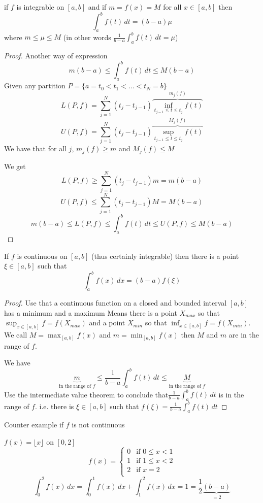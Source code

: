 \begin{theorem*}
  if $f$ is integrable on $[a, b]$ and if $m = f(x) = M$ for all $x \in [a, b]$ then
  \[\int_a^b f(t)\, dt = (b-a)\mu \]
  where $m \le \mu \le M$
  (in other words $\displaystyle \frac{1}{b-a}\int_a^b f(t) \,dt = \mu$)
\end{theorem*}

\begin{proof}
  Another way of expression 
  \[ m(b-a) \le \int_a^b f(t)\, dt \le M(b-a)\]
  Given any partition $P = \{a = t_0 < t_1 < \dotsc < t_N = b\}$
  \[ L(P, f) = \sum_{j=1}^N (t_j - t_{j-1}) \overbrace{\inf_{t_{j-1} \le t \le t_j} f(t)}^{m_j(f)}\]
  \[ U(P, f) = \sum_{j=1}^N (t_j - t_{j-1}) \overbrace{\sup_{t_{j-1} \le t \le t_j} f(t)}^{M_j(f)}\]
  We have that for all $j$, $m_j(f) \ge m$ and $M_j(f) \le M$

  We get 
  \[L(P, f) \ge \sum_{j=1}^N (t_j - t_{j-1})m = m(b-a)\]
  \[U(P, f) \le \sum_{j=1}^N (t_j - t_{j-1})M = M(b-a)\]
  \[m(b-a) \le L(P, f) \le \int_a^b f(t)\, dt \le U(P, f) \le M(b-a)\]
\end{proof}

\begin{theorem*}
  If $f$ is continuous on $[a, b]$ (thus certainly integrable) then there is a point $\xi \in [a, b]$
  such that 
  \[\int_a^b f(x)\,dx = (b-a)f(\xi)\]
\end{theorem*}

\begin{proof}
  Use that a continuous function on a closed and bounded interval $[a, b]$ has a minimum and a maximum
  Means there is a point $X_{max}$ so that $\sup_{x \in [a, b]} f = f(X_{max})$ and a point $X_{min}$ so that $\inf_{x \in [a, b]} f = f(X_{min})$.
  We call $M = \max_{[a, b]} f(x)$ and $m = \min_{[a, b]} f(x)$ then $M$ and $m$ are in the range of $f$.

  We have 
  \[\underbrace{m}_{\text{in the range of }f} \le \frac{1}{b-a}\int_a^b f(t)\,dt \le \underbrace{M}_{\text{in the range of }f}\]
  Use the intermediate value theorem to conclude that$\displaystyle \frac{1}{b-a}\int_a^b f(t)\,dt$ is in the range of $f$.
  i.e. there is $\xi \in [a, b]$ such that $\displaystyle f(\xi) = \frac{1}{b-a}\int_a^b f(t)\,dt$ 
\end{proof}

Counter example if $f$ is not continuous

\begin{example*}
  $f(x) = \lfloor x \rfloor$ on $[0, 2]$
  \[ f(x) = \begin{cases}
  0 & \text{if }  0 \le x < 1 \\
  1 & \text{if } 1 \le x < 2 \\ 
  2 & \text{if } x = 2 \\  
  \end{cases}  \]
  \[\int_0^2 f(x)\,dx = \int_0^1 f(x)\,dx + \int_1^2 f(x)\,dx = 1 = \frac{1}{2}\underbrace{(b-a)}_{=2} \]
\end{example*}


